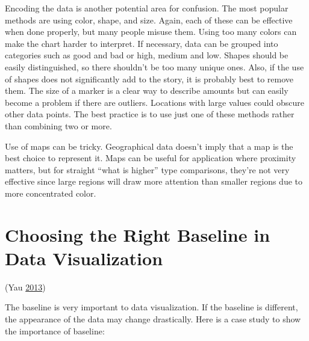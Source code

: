 \documentclass[]{book}
\begin{document}
Encoding the data is another potential area for confusion. The most popular methods are using color, shape, and size. Again, each of these can be effective when done properly, but many people misuse them. Using too many colors can make the chart harder to interpret. If necessary, data can be grouped into categories such as good and bad or high, medium and low. Shapes should be easily distinguished, so there shouldn't be too many unique ones. Also, if the use of shapes does not significantly add to the story, it is probably best to remove them. The size of a marker is a clear way to describe amounts but can easily become a problem if there are outliers. Locations with large values could obscure other data points. The best practice is to use just one of these methods rather than combining two or more.

Use of maps can be tricky. Geographical data doesn't imply that a map is the best choice to represent it. Maps can be useful for application where proximity matters, but for straight ``what is higher'' type comparisons, they're not very effective since large regions will draw more attention than smaller regions due to more concentrated color.

\hypertarget{choosing-the-right-baseline-in-data-visualization}{%
\section{Choosing the Right Baseline in Data Visualization}\label{choosing-the-right-baseline-in-data-visualization}}

(Yau \protect\hyperlink{ref-baseline_2013}{2013})

The baseline is very important to data visualization. If the baseline is different, the appearance of the data may change drastically. Here is a case study to show the importance of baseline:
\end{document}
